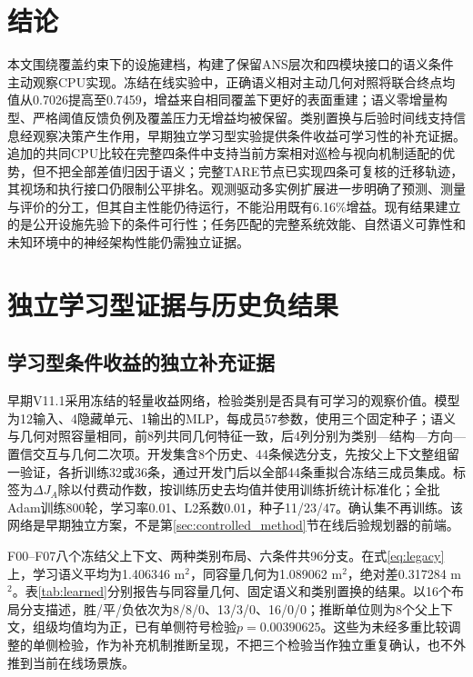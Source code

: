 \documentclass[11pt,a4paper]{article}
\begin{document}
\section{结论}
本文围绕覆盖约束下的设施建档，构建了保留ANS层次和四模块接口的语义条件主动观察CPU实现。冻结在线实验中，正确语义相对主动几何对照将联合终点均值从0.7026提高至0.7459，增益来自相同覆盖下更好的表面重建；语义零增量构型、严格阈值反馈负例及覆盖压力无增益均被保留。类别置换与后验时间线支持信息经观察决策产生作用，早期独立学习型实验提供条件收益可学习性的补充证据。追加的共同CPU比较在完整四条件中支持当前方案相对巡检与视向机制适配的优势，但不把全部差值归因于语义；完整TARE节点已实现四条可复核的迁移轨迹，其视场和执行接口仍限制公平排名。观测驱动多实例扩展进一步明确了预测、测量与评价的分工，但其自主性能仍待运行，不能沿用既有6.16\%增益。现有结果建立的是公开设施先验下的条件可行性；任务匹配的完整系统效能、自然语义可靠性和未知环境中的神经架构性能仍需独立证据。

\appendix
\section{独立学习型证据与历史负结果}
\label{app:legacy}
\subsection{学习型条件收益的独立补充证据}
早期V11.1采用冻结的轻量收益网络，检验类别是否具有可学习的观察价值。模型为12输入、4隐藏单元、1输出的MLP，每成员57参数，使用三个固定种子；语义与几何对照容量相同，前8列共同几何特征一致，后4列分别为类别—结构—方向—置信交互与几何二次项。开发集含8个历史、44条候选分支，先按父上下文整组留一验证，各折训练32或36条，通过开发门后以全部44条重拟合冻结三成员集成。标签为$\Delta J_A$除以付费动作数，按训练历史去均值并使用训练折统计标准化；全批Adam训练800轮，学习率0.01、L2系数0.01，种子11/23/47。确认集不再训练。该网络是早期独立方案，不是第\ref{sec:controlled_method}节在线后验规划器的前端。

F00--F07八个冻结父上下文、两种类别布局、六条件共96分支。在式\eqref{eq:legacy}上，学习语义平均为1.406346 m$^2$，同容量几何为1.089062 m$^2$，绝对差0.317284 m$^2$。表\ref{tab:learned}分别报告与同容量几何、固定语义和类别置换的结果。以16个布局分支描述，胜/平/负依次为8/8/0、13/3/0、16/0/0；推断单位则为8个父上下文，组级均值均为正，已有单侧符号检验$p=0.00390625$。这些为未经多重比较调整的单侧检验，作为补充机制推断呈现，不把三个检验当作独立重复确认，也不外推到当前在线场景族。

\begin{table}[tb]
\centering\small
\caption{V11.1冻结学习型确认的补充结果。主指标为前缀后$\Delta J_A$（m$^2$），学习语义均值1.406346。差为学习语义减对照，区间是已保存的8父上下文整组bootstrap 95\%区间。}
\label{tab:learned}

\end{table}
\end{document}
